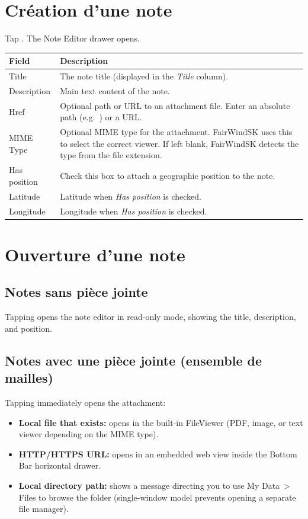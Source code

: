 \section{Création d'une note}

Tap . The Note Editor drawer opens.


\begin{longtable}{L{3cm} L{10.7cm}}
\toprule
{}
{\sffamily\bfseries\color{white} Field} &
{\sffamily\bfseries\color{white} Description} \\
\midrule
Title & The note title (displayed in the \textit{Title} column). \\
Description & Main text content of the note. \\
Href & Optional path or URL to an attachment file. Enter an absolute path (e.g.\ ) or a URL. \\
MIME Type & Optional MIME type for the attachment. FairWindSK uses this to select the correct viewer. If left blank, FairWindSK detects the type from the file extension. \\
Has position & Check this box to attach a geographic position to the note. \\
Latitude & Latitude when \textit{Has position} is checked. \\
Longitude & Longitude when \textit{Has position} is checked. \\
\bottomrule
\end{longtable}

\section{Ouverture d'une note}

\subsection{Notes sans pièce jointe}

Tapping  opens the note editor in read-only mode, showing the title, description, and position.

\subsection{Notes avec une pièce jointe (ensemble de mailles)}

Tapping  immediately opens the attachment:

\begin{itemize}
  \item \textbf{Local file that exists:} opens in the built-in FileViewer (PDF, image, or text viewer depending on the MIME type).
  \item \textbf{HTTP/HTTPS URL:} opens in an embedded web view inside the Bottom Bar horizontal drawer.
  \item \textbf{Local directory path:} shows a message directing you to use My Data~> Files to browse the folder (single-window model prevents opening a separate file manager).
\end{itemize}

